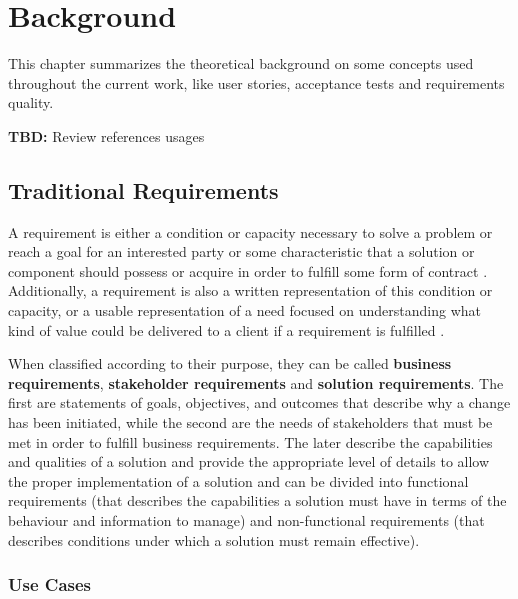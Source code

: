 \chapter{\label{chap:chap2}Background}

This chapter summarizes the theoretical background on some concepts used throughout the current work, like user stories, acceptance tests and requirements quality.

\textbf{TBD:} Review references usages

\section{Traditional Requirements}

A requirement is either a condition or capacity necessary to solve a problem or reach a goal for an interested party or some characteristic that a solution or component should possess or acquire in order to fulfill some form of contract \cite{Babok_2009}. Additionally, a requirement is also a written representation of this condition or capacity, or a usable representation of a need focused on understanding what kind of value could be delivered to a client if a requirement is fulfilled \cite{Babok_2015}. 

When classified according to their purpose, they can be called \textbf{business requirements}, \textbf{stakeholder requirements} and \textbf{solution requirements}. The first are statements of goals, objectives, and outcomes that describe why a change has been initiated, while the second are the needs of stakeholders that must be met in order to fulfill business requirements. The later describe the capabilities and qualities of a solution and provide the appropriate level of details to allow the proper implementation of a solution and can be divided into functional requirements (that describes the capabilities a solution must have in terms of the behaviour and information to manage) and non-functional requirements (that describes conditions under which a solution must remain effective). 

\subsection{Use Cases}

